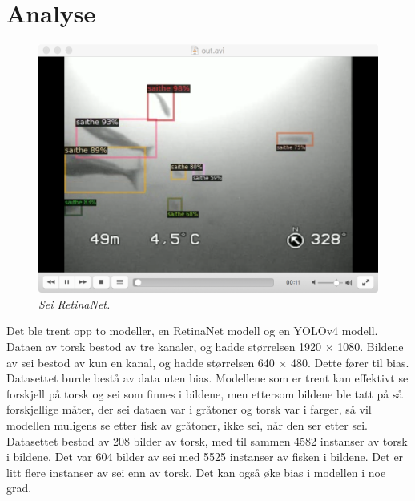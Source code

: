 

\section{Analyse}

\begin{figure}[h!]
\begin{center} 
\includegraphics[scale=0.35]{figures/retinanet_inference_saithe}
\caption{\small \sl Sei RetinaNet. \label{fig:retinanet_inference_saithe}}
\end{center}
\end{figure}

Det ble trent opp to modeller, en RetinaNet modell og en YOLOv4 modell. Dataen av torsk bestod av tre kanaler, og hadde størrelsen 1920 $\times$ 1080. Bildene av sei bestod av kun en kanal, og hadde størrelsen 640 $\times$ 480. Dette fører til bias. Datasettet burde bestå av data uten bias. Modellene som er trent kan effektivt se forskjell på torsk og sei som finnes i bildene, men ettersom bildene ble tatt på så forskjellige måter, der sei dataen var i gråtoner og torsk var i farger, så vil modellen muligens se etter fisk av gråtoner, ikke sei, når den ser etter sei. Datasettet bestod av 208 bilder av torsk, med til sammen 4582 instanser av torsk i bildene. Det var 604 bilder av sei med 5525 instanser av fisken i bildene. Det er litt flere instanser av sei enn av torsk. Det kan også øke bias i modellen i noe grad.

